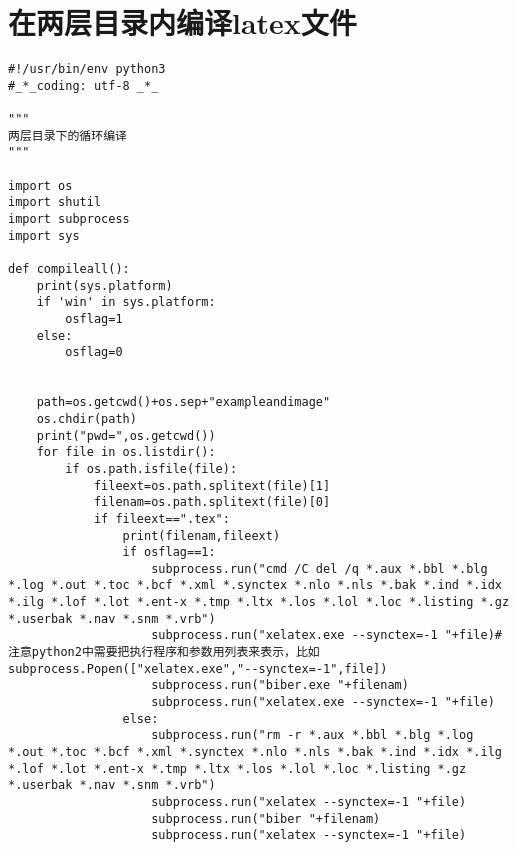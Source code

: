 \documentclass[twoside,11pt]{book}
\begin{document}
\section{在两层目录内编译latex文件}

\begin{lstlisting}
#!/usr/bin/env python3
#_*_coding: utf-8 _*_

"""
两层目录下的循环编译
"""

import os
import shutil
import subprocess
import sys

def compileall():
    print(sys.platform)
    if 'win' in sys.platform:
        osflag=1
    else:
        osflag=0


    path=os.getcwd()+os.sep+"exampleandimage"
    os.chdir(path)
    print("pwd=",os.getcwd())
    for file in os.listdir():
        if os.path.isfile(file):
            fileext=os.path.splitext(file)[1]
            filenam=os.path.splitext(file)[0]
            if fileext==".tex":
                print(filenam,fileext)
                if osflag==1:
                    subprocess.run("cmd /C del /q *.aux *.bbl *.blg *.log *.out *.toc *.bcf *.xml *.synctex *.nlo *.nls *.bak *.ind *.idx *.ilg *.lof *.lot *.ent-x *.tmp *.ltx *.los *.lol *.loc *.listing *.gz *.userbak *.nav *.snm *.vrb")
                    subprocess.run("xelatex.exe --synctex=-1 "+file)#注意python2中需要把执行程序和参数用列表来表示，比如subprocess.Popen(["xelatex.exe","--synctex=-1",file])
                    subprocess.run("biber.exe "+filenam)
                    subprocess.run("xelatex.exe --synctex=-1 "+file)
                else:
                    subprocess.run("rm -r *.aux *.bbl *.blg *.log *.out *.toc *.bcf *.xml *.synctex *.nlo *.nls *.bak *.ind *.idx *.ilg *.lof *.lot *.ent-x *.tmp *.ltx *.los *.lol *.loc *.listing *.gz *.userbak *.nav *.snm *.vrb")
                    subprocess.run("xelatex --synctex=-1 "+file)
                    subprocess.run("biber "+filenam)
                    subprocess.run("xelatex --synctex=-1 "+file)


\end{lstlisting}
\end{document}
